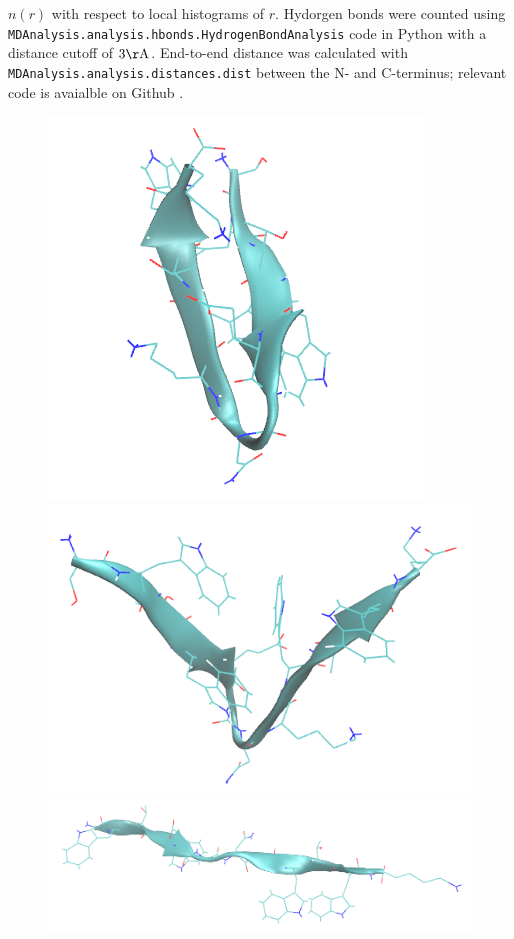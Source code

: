 \documentclass{article}[12pt]
\numberwithin{equation}{section}
\def\code#1{\texttt{#1}}
\begin{document}
$n(r)$ with respect to local histograms of $r$. Hydorgen bonds were counted
using \code{MDAnalysis.analysis.hbonds.HydrogenBondAnalysis} code in Python with
a distance cutoff of $3\mathrm{\AA}$. End-to-end distance was calculated with
\code{MDAnalysis.analysis.distances.dist} between the N- and C-terminus;
relevant code is avaialble on Github \cite{github}.
\begin{figure}[H]
	\centering{}
	\captionsetup{justification=centering}
	\includegraphics[scale=0.21]{hairpin-1}
	\includegraphics[scale=0.21]{hairpin-2}
	\includegraphics[scale=0.21]{hairpin-3}

\end{figure}
\end{document}

